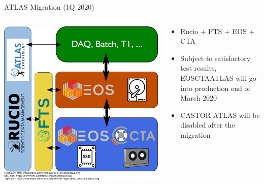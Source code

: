 \documentclass[aspectratio=1610]{beamer}
\begin{document}
\begin{frame}{ATLAS Migration (1Q 2020)}
\begin{columns}
	\begin{column}{0.4\textwidth}
		\begin{center}
         \includegraphics[width=\textwidth]{images/CTA_Deployment_Atlas}
		\end{center}
	\end{column}
	\begin{column}{0.55\textwidth}
   \begin{itemize}
      \item Rucio + FTS + EOS + CTA
      \item Subject to satisfactory test results, EOSCTAATLAS will go into production end of March 2020
      \item CASTOR ATLAS will be disabled after the migration
   \end{itemize}
	\end{column}
\end{columns}
\end{frame}
\end{document}
